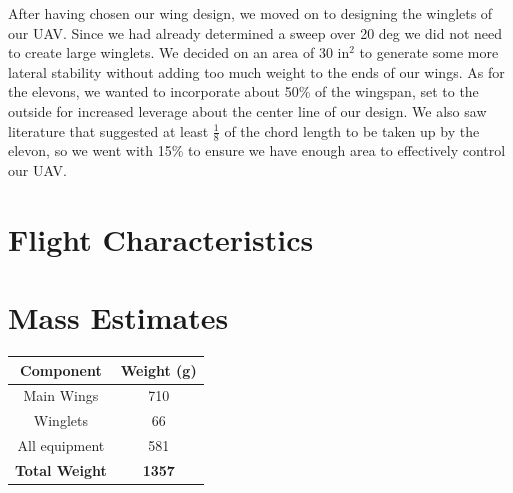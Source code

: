     After having chosen our wing design, we moved on to designing the winglets of our UAV. Since we had already determined a sweep over 20 deg we did not need to create large winglets. We decided on an area of 30 $\text{in}^2$ to generate some more lateral stability without adding too much weight to the ends of our wings. As for the elevons, we wanted to incorporate about 50\% of the wingspan, set to the outside for increased leverage about the center line of our design. We also saw literature that suggested at least $\frac{1}{8}$ of the chord length to be taken up by the elevon, so we went with 15\% to ensure we have enough area to effectively control our UAV.


\section{Flight Characteristics}

\section{Mass Estimates}

    \begin{center}
    \begin{tabular}{|c|c|} 
    \hline
        \textbf{Component} & \textbf{Weight (g)} \\ \hline
        Main Wings & 710 \\ \hline
        Winglets & 66 \\ \hline
        All equipment & 581 \\ \hline
        \textbf{Total Weight} & \textbf{1357} \\ \hline
    \end{tabular}
    \end{center}

